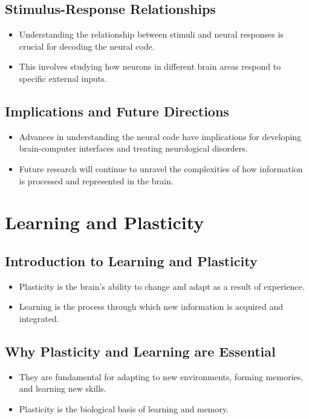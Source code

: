 \documentclass{article}
\begin{document}
\subsection{Stimulus-Response Relationships}
\begin{itemize}
    \item Understanding the relationship between stimuli and neural responses is crucial for decoding the neural code.
    \item This involves studying how neurons in different brain areas respond to specific external inputs.
\end{itemize}

\subsection{Implications and Future Directions}
\begin{itemize}
    \item Advances in understanding the neural code have implications for developing brain-computer interfaces and treating neurological disorders.
    \item Future research will continue to unravel the complexities of how information is processed and represented in the brain.
\end{itemize}
\section{Learning and Plasticity}

\subsection{Introduction to Learning and Plasticity}
\begin{itemize}
    \item Plasticity is the brain's ability to change and adapt as a result of experience.
    \item Learning is the process through which new information is acquired and integrated.
\end{itemize}

\subsection{Why Plasticity and Learning are Essential}
\begin{itemize}
    \item They are fundamental for adapting to new environments, forming memories, and learning new skills.
    \item Plasticity is the biological basis of learning and memory.
\end{itemize}
\end{document}

